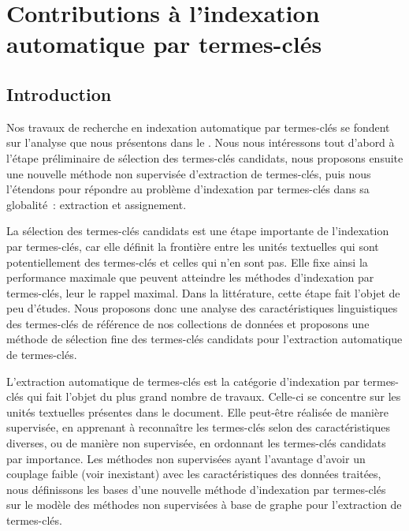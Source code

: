 \chapter{Contributions à l'indexation automatique par termes-clés}
\label{chap:main-automatic_keyphrase_annotation}

  \section{Introduction}
  \label{sec:main-automatic_keyphrase_annotation-introduction}
    Nos travaux de recherche en indexation automatique par termes-clés se
    fondent sur l'analyse que nous présentons dans le
    . Nous nous intéressons tout
    d'abord à l'étape préliminaire de sélection des termes-clés candidats, nous
    proposons ensuite une nouvelle méthode non supervisée d'extraction de
    termes-clés, puis nous l'étendons pour répondre au problème d'indexation par
    termes-clés dans sa globalité~: extraction et assignement.

    La sélection des termes-clés candidats est une étape importante de
    l'indexation par termes-clés, car elle définit la frontière entre les unités
    textuelles qui sont potentiellement des termes-clés et celles qui n'en sont
    pas. Elle fixe ainsi la performance maximale que peuvent atteindre les
    méthodes d'indexation par termes-clés, leur le rappel maximal. Dans la
    littérature, cette étape fait l'objet de peu d'études. Nous proposons donc
    une analyse des caractéristiques linguistiques des termes-clés de référence
    de nos collections de données et proposons une méthode de sélection fine des
    termes-clés candidats pour l'extraction automatique de termes-clés.

    L'extraction automatique de termes-clés est la catégorie d'indexation par
    termes-clés qui fait l'objet du plus grand nombre de travaux. Celle-ci se
    concentre sur les unités textuelles présentes dans le document. Elle
    peut-être réalisée de manière supervisée, en apprenant à reconnaître les
    termes-clés selon des caractéristiques diverses, ou de manière non
    supervisée, en ordonnant les termes-clés candidats par importance. Les
    méthodes non supervisées ayant l'avantage d'avoir un couplage faible (voir
    inexistant) avec les caractéristiques des données traitées, nous définissons
    les bases d'une nouvelle méthode d'indexation par termes-clés sur le modèle
    des méthodes non supervisées à base de graphe pour l'extraction de
    termes-clés.

